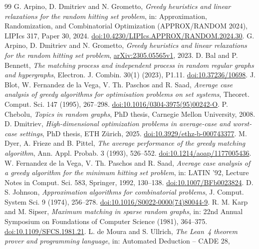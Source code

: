 \documentclass[11pt]{article}
\theoremstyle{remark}
\begin{document}
\begin{thebibliography}{99}
 G. Arpino, D. Dmitriev and N. Grometto,
\emph{Greedy heuristics and linear relaxations for the random hitting set
problem}, in: Approximation, Randomization, and Combinatorial Optimization
(APPROX/RANDOM 2024), LIPIcs 317, Paper 30, 2024.
\href{https://doi.org/10.4230/LIPIcs.APPROX/RANDOM.2024.30}{doi:10.4230/LIPIcs.APPROX/RANDOM.2024.30}.
 G. Arpino, D. Dmitriev and N. Grometto,
\emph{Greedy heuristics and linear relaxations for the random hitting set
problem}, \href{https://arxiv.org/abs/2305.05565v1}{arXiv:2305.05565v1}, 2023.
 D. Bal and P. Bennett, \emph{The matching process and
independent process in random regular graphs and hypergraphs}, Electron.
J. Combin. 30(1) (2023), P1.11.
\href{https://doi.org/10.37236/10698}{doi:10.37236/10698}.
 J. Blot, W. Fernandez de la Vega, V. Th. Paschos and R. Saad,
\emph{Average case analysis of greedy algorithms for optimisation problems
on set systems}, Theoret. Comput. Sci. 147 (1995), 267--298.
\href{https://doi.org/10.1016/0304-3975(95)00242-O}{doi:10.1016/0304-3975(95)00242-O}.
 P. Chebolu, \emph{Topics in random graphs}, PhD thesis,
Carnegie Mellon University, 2008.
 D. Dmitriev, \emph{High-dimensional optimization problems
in average-case and worst-case settings}, PhD thesis, ETH Z\"urich, 2025.
\href{https://doi.org/10.3929/ethz-b-000743377}{doi:10.3929/ethz-b-000743377}.
 M. Dyer, A. Frieze and B. Pittel, \emph{The average
performance of the greedy matching algorithm}, Ann. Appl. Probab. 3 (1993),
526--552. \href{https://doi.org/10.1214/aoap/1177005436}{doi:10.1214/aoap/1177005436}.
 W. Fernandez de la Vega, V. Th. Paschos and R. Saad,
\emph{Average case analysis of a greedy algorithm for the minimum hitting set
problem}, in: LATIN '92, Lecture Notes in Comput. Sci. 583, Springer, 1992,
130--138. \href{https://doi.org/10.1007/BFb0023824}{doi:10.1007/BFb0023824}.
 D. S. Johnson, \emph{Approximation algorithms for
combinatorial problems}, J. Comput. System Sci. 9 (1974), 256--278.
\href{https://doi.org/10.1016/S0022-0000(74)80044-9}{doi:10.1016/S0022-0000(74)80044-9}.
 R. M. Karp and M. Sipser, \emph{Maximum matching in sparse
random graphs}, in: 22nd Annual Symposium on Foundations of Computer
Science (1981), 364--375.
\href{https://doi.org/10.1109/SFCS.1981.21}{doi:10.1109/SFCS.1981.21}.
 L. de Moura and S. Ullrich, \emph{The Lean~4 theorem
prover and programming language}, in: Automated Deduction -- CADE 28,

\end{thebibliography}
\end{document}
